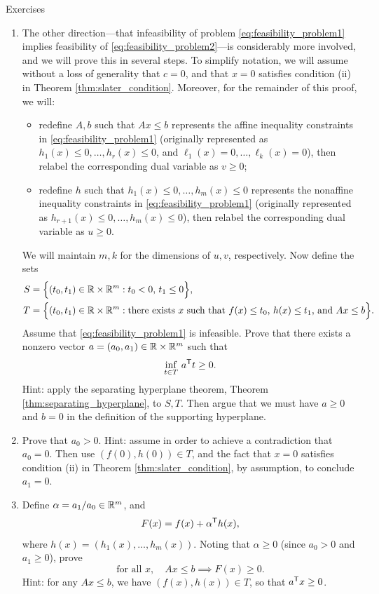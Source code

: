 \begin{xcb}{Exercises}
\begin{enumerate}[label=\thechapter.\arabic*]
\begin{enumerate}[label=\alph*.]
\item The other direction---that infeasibility of problem
  \eqref{eq:feasibility_problem1} implies feasibility of
  \eqref{eq:feasibility_problem2}---is considerably more involved, and we will
  prove this in several steps. To simplify notation, we will assume without a
  loss of generality that $c = 0$, and that $x = 0$ satisfies condition (ii) in
  Theorem \ref{thm:slater_condition}. Moreover, for the remainder of this proof,
  we will:    
  \begin{itemize}  
  \item redefine $A,b$ such that $Ax \leq b$ represents the affine inequality 
    constraints in \eqref{eq:feasibility_problem1} (originally represented as 
    $h_1(x) \leq 0, \dots, h_r(x) \leq 0$, and $\ell_1(x) = 0, \dots, \ell_k(x)
    = 0$), then relabel the corresponding dual variable as $v \geq 0$;     
  \item redefine $h$ such that $h_1(x) \leq 0, \dots, h_m(x) \leq 0$ represents 
    the nonaffine inequality constraints in \eqref{eq:feasibility_problem1}
    (originally represented as $h_{r+1}(x) \leq 0, \dots, h_m(x) \leq 0$), then
    relabel the corresponding dual variable as $u \geq 0$.  
  \end{itemize}
  We will maintain $m,k$ for the dimensions of $u,v$, respectively. Now define
  the sets     
  \begin{align*}
  S &= \Big\{ (t_0, t_1) \in \mathbb{R} \times \mathbb{R}^m : t_0 < 0, \, t_1 \leq 0 \Big\}, \\  
  T &= \Big\{ (t_0, t_1) \in \mathbb{R} \times \mathbb{R}^m : \text{there exists $x$ such that
      $f(x) \leq t_0$, $h(x) \leq t_1$, and $Ax \leq b$} \Big\}. 
  \end{align*}
  Assume that \eqref{eq:feasibility_problem1} is infeasible. Prove that there
  exists a nonzero vector $a = (a_0, a_1) \in \mathbb{R} \times \mathbb{R}^m$ such that 
  \[
  \inf_{t \in T} \, a^{\mathsf{T}} t \geq 0.  
  \]
  Hint: apply the separating hyperplane theorem, Theorem
  \ref{thm:separating_hyperplane}, to $S,T$. Then argue that we must have $a
  \geq 0$ and $b = 0$ in the definition of the supporting hyperplane. 

\item Prove that $a_0 > 0$. Hint: assume in order to achieve a contradiction 
  that $a_0 = 0$. Then use $(f(0), h(0)) \in T$, and the fact that $x = 0$
  satisfies condition (ii) in Theorem \ref{thm:slater_condition}, by assumption,
  to conclude $a_1 = 0$.
\item Define $\alpha = a_1 / a_0 \in \mathbb{R}^m$, and  
  \[
  F(x) = f(x) + \alpha^{\mathsf{T}} h(x),
  \]
  where $h(x) = (h_1(x), \dots, h_m(x))$. Noting that $\alpha \geq 0$ (since
  $a_0 > 0$ and $a_1 \geq 0$), prove
  \[
 \text{for all $x$}, \quad Ax \leq b \implies F(x) \geq 0.
  \]
  Hint: for any $Ax \leq b$, we have $(f(x), h(x)) \in T$, so that $a^{\mathsf{T}} x \geq
  0$.


\end{enumerate}
\end{enumerate}
\end{xcb}
